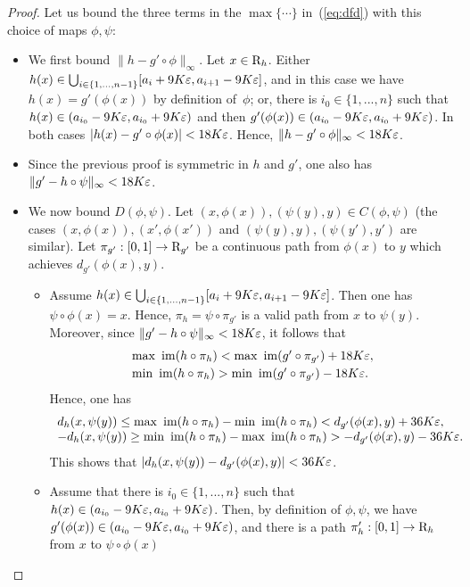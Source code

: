 \begin{proof}
\noindent Let us bound the
three terms in the $\max\{\cdots\}$ in~(\ref{eq:dfd})
with this choice of maps $\phi, \psi$: 
\begin{itemize}
\item We first  bound $\|h-g'\circ\phi\|_\infty$. Let $x\in\mathrm{R}_h$. Either $h(x)\in \bigcup_{i\in\{1,...,n-1\}} [a_i+9K\varepsilon,a_{i+1}-9K\varepsilon]$,  
and in this case we have $h(x)=g'(\phi(x))$ by definition of~$\phi$;
or, there is $i_0\in\{1,...,n\}$ such that $h(x)\in (a_{i_0}-9K\varepsilon,a_{i_0}+9K\varepsilon)$ and then $g'(\phi(x))\in (a_{i_0}-9K\varepsilon,a_{i_0}+9K\varepsilon)$.
In both cases $|h(x)-g'\circ\phi(x)| < 18K\varepsilon$. Hence, $\|h-g'\circ\phi\|_\infty < 18K\varepsilon$.
\item Since the previous proof is symmetric in $h$ and $g'$, one also has $\|g'-h\circ\psi\|_\infty < 18K\varepsilon$.
\item We now bound $D(\phi,\psi)$. Let $(x,\phi(x)),(\psi(y),y)\in C(\phi,\psi)$ (the cases $(x,\phi(x)),(x',\phi(x'))$
and $(\psi(y),y),(\psi(y'),y')$ are similar). Let $\pi_{g'}:[0,1]\rightarrow\mathrm{R}_{g'}$ be a continuous path from $\phi(x)$ to $y$  
which achieves $d_{g'}(\phi(x),y)$.
\begin{itemize}
\item Assume $h(x)\in \bigcup_{i\in\{1,...,n-1\}} [a_i+9K\varepsilon,a_{i+1}-9K\varepsilon]$. Then one has $\psi\circ\phi(x)=x$.
Hence, $\pi_h=\psi\circ\pi_{g'}$ is a valid path from $x$ to $\psi(y)$. Moreover, since $\|g'-h\circ\psi\|_\infty < 18K\varepsilon$,
it follows that
\begin{equation}\label{eqs:noname}
\begin{array}{l}\max\ \mathrm{im}(h\circ \pi_{h}) < \max\ \mathrm{im}(g'\circ \pi_{g'}) +18K\varepsilon,\\[0.5ex]
\min\ \mathrm{im}(h\circ\pi_{h}) > \min\ \mathrm{im}(g'\circ\pi_{g'}) -18K\varepsilon.\end{array}
\end{equation}
Hence, one has 
$$\begin{array}{l}d_h(x,\psi(y))\leq \max\ \im(h\circ\pi_{h})-\min\ \im(h\circ\pi_{h}) < d_{g'}(\phi(x),y)+36K\e,\\
-d_h(x,\psi(y))\geq \min\ \im(h\circ\pi_{h})-\max\ \im(h\circ\pi_{h}) > -d_{g'}(\phi(x),y)-36K\e.\end{array}$$
This shows that $|d_h(x,\psi(y))-d_{g'}(\phi(x),y)| < 36K\varepsilon$.
\item Assume that there is $i_0\in\{1,...,n\}$ such that $h(x)\in(a_{i_0}-9K\varepsilon,a_{i_0}+9K\varepsilon)$.
Then, by definition of $\phi, \psi$, we have  $g'(\phi(x))\in(a_{i_0}-9K\varepsilon,a_{i_0}+9K\varepsilon)$, and
there is a path
$\pi'_{h}:[0,1]\rightarrow\mathrm{R}_h$ from $x$ to $\psi\circ\phi(x)$

\end{itemize}
\end{itemize}
\end{proof}
